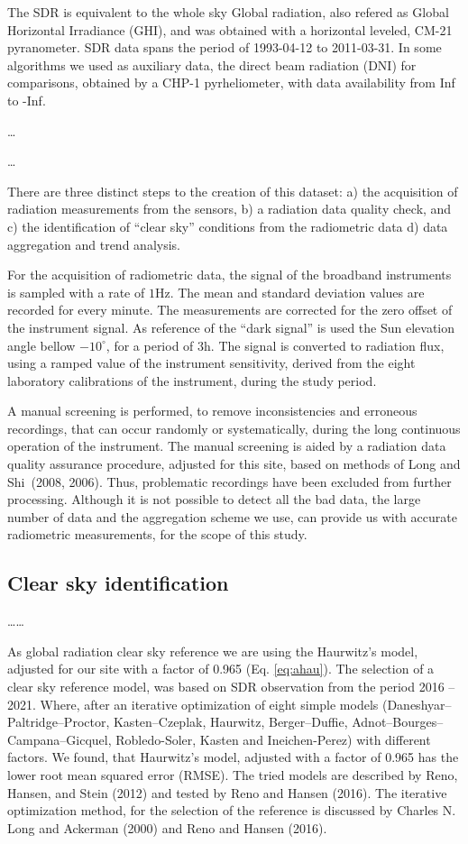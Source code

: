 \documentclass[
  preprint, 3p, authoryear]{article}
\begin{document}
The SDR is equivalent to the whole sky Global radiation, also refered as Global Horizontal Irradiance (GHI), and was obtained with a horizontal leveled, CM-21 pyranometer.
SDR data spans the period of
1993-04-12 to 2011-03-31.
In some algorithms we used as auxiliary data, the direct beam radiation (DNI) for comparisons, obtained by a CHP-1 pyrheliometer, with data availability from
Inf to -Inf.

\ldots{}

\ldots{}

There are three distinct steps to the creation of this dataset:
a) the acquisition of radiation measurements from the sensors,
b) a radiation data quality check, and
c) the identification of ``clear sky'' conditions from the radiometric data
d) data aggregation and trend analysis.

For the acquisition of radiometric data,
the signal of the broadband instruments is sampled with a rate of \(1 \text{Hz}\). The mean and standard deviation values are recorded for every minute.
The measurements are corrected for the zero offset of the instrument signal.
As reference of the ``dark signal'' is used the Sun elevation angle bellow \(-10^\circ\), for a period of \(3 \text{h}\).
The signal is converted to radiation flux, using a ramped value of the instrument sensitivity, derived from the eight laboratory calibrations of the instrument, during the study period.

A manual screening is performed, to remove inconsistencies and erroneous recordings, that can occur randomly or systematically, during the long continuous operation of the instrument.
The manual screening is aided by a radiation data quality assurance procedure, adjusted for this site, based on methods of Long and Shi~(2008, 2006).
Thus, problematic recordings have been excluded from further processing.
Although it is not possible to detect all the bad data, the large number of data and the aggregation scheme we use, can provide us with accurate radiometric measurements, for the scope of this study.

\hypertarget{clear-sky-identification}{%
\subsection{Clear sky identification}\label{clear-sky-identification}}

\ldots\ldots{}

As global radiation clear sky reference we are using the Haurwitz's model, adjusted for our site with a factor of 0.965 (Eq. \ref{eq:ahau}).
The selection of a clear sky reference model, was based on SDR observation from the period 2016 -- 2021.
Where, after an iterative optimization of eight simple models (Daneshyar--Paltridge--Proctor, Kasten--Czeplak, Haurwitz, Berger--Duffie, Adnot--Bourges--Campana--Gicquel, Robledo-Soler, Kasten and Ineichen-Perez) with different factors.
We found, that Haurwitz's model, adjusted with a factor of 0.965 has the lower root mean squared error (RMSE).
The tried models are described by Reno, Hansen, and Stein (2012) and tested by Reno and Hansen (2016).
The iterative optimization method, for the selection of the reference is discussed by Charles N. Long and Ackerman (2000) and Reno and Hansen (2016).
\end{document}
